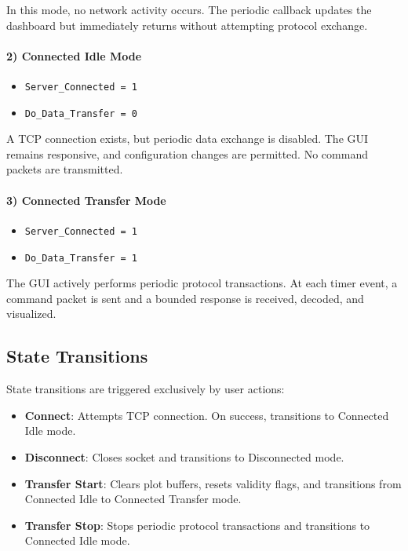 In this mode, no network activity occurs. The periodic callback updates the dashboard but immediately returns without attempting protocol exchange.

\paragraph{2) Connected Idle Mode}

\begin{itemize}
	\item \texttt{Server\_Connected = 1}
	\item \texttt{Do\_Data\_Transfer = 0}
\end{itemize}

A TCP connection exists, but periodic data exchange is disabled. The GUI remains responsive, and configuration changes are permitted. No command packets are transmitted.

\paragraph{3) Connected Transfer Mode}

\begin{itemize}
	\item \texttt{Server\_Connected = 1}
	\item \texttt{Do\_Data\_Transfer = 1}
\end{itemize}

The GUI actively performs periodic protocol transactions. At each timer event, a command packet is sent and a bounded response is received, decoded, and visualized.

\subsection{State Transitions}
\label{sec:gui_state_transitions}

State transitions are triggered exclusively by user actions:

\begin{itemize}
	\item \textbf{Connect}: Attempts TCP connection. On success, transitions to Connected Idle mode.
	\item \textbf{Disconnect}: Closes socket and transitions to Disconnected mode.
	\item \textbf{Transfer Start}: Clears plot buffers, resets validity flags, and transitions from Connected Idle to Connected Transfer mode.
	\item \textbf{Transfer Stop}: Stops periodic protocol transactions and transitions to Connected Idle mode.
\end{itemize}

